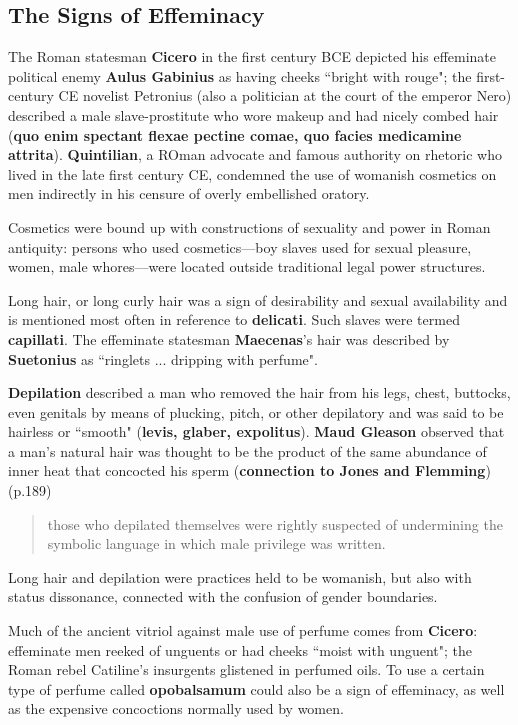 \subsection{The Signs of Effeminacy}

The Roman statesman \textbf{Cicero} in the first century BCE depicted his effeminate political enemy \textbf{Aulus Gabinius} as having cheeks ``bright with rouge"; the first-century CE novelist Petronius (also a politician at the court of the emperor Nero) described a male slave-prostitute who wore makeup and had nicely combed hair (\textbf{quo enim spectant flexae pectine comae, quo facies medicamine attrita}). \textbf{Quintilian}, a ROman advocate and famous authority on rhetoric who lived in the late first century CE, condemned the use of womanish cosmetics on men indirectly in his censure of overly embellished oratory.

\begin{rmk}
    Cosmetics were bound up with constructions of sexuality and power in Roman antiquity: persons who used cosmetics---boy slaves used for sexual pleasure, women, male whores---were located outside traditional legal power structures.
\end{rmk}

Long hair, or long curly hair was a sign of desirability and sexual availability and is mentioned most often in reference to \textbf{delicati}. Such slaves were termed \textbf{capillati}. The effeminate statesman \textbf{Maecenas}'s hair was described by \textbf{Suetonius} as ``ringlets ... dripping with perfume".

\textbf{Depilation} described a man who removed the hair from his legs, chest, buttocks, even genitals by means of plucking, pitch, or other depilatory and was said to be hairless or ``smooth" (\textbf{levis, glaber, expolitus}). \textbf{Maud Gleason} observed that a man's natural hair was thought to be the product of the same abundance of inner heat that concocted his sperm (\textbf{connection to Jones and Flemming}) (p.189)

\begin{quotation}
    those who depilated themselves were rightly suspected of undermining the symbolic language in which male privilege was written.
\end{quotation}

Long hair and depilation were practices held to be womanish, but also with status dissonance, connected with the confusion of gender boundaries.

\begin{rmk}
    Much of the ancient vitriol against male use of perfume comes from \textbf{Cicero}: effeminate men reeked of unguents or had cheeks ``moist with unguent"; the Roman rebel Catiline's insurgents glistened in perfumed oils. To use a certain type of perfume called \textbf{opobalsamum} could also be a sign of effeminacy, as well as the expensive concoctions normally used by women.
\end{rmk}

